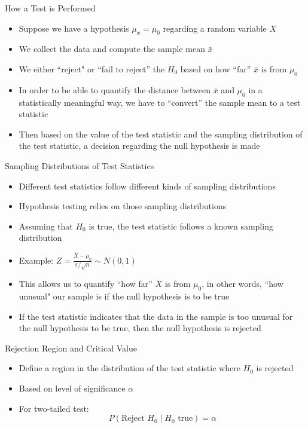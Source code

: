 \documentclass[12pt, aspectratio=169]{beamer}
\begin{document}
    \begin{frame}{How a Test is Performed}
        \begin{itemize}
            \item Suppose we have a hypothesis \(\mu_x = \mu_0\) regarding a random variable \(X\)
            \item We collect the data and compute the sample mean \(\bar{x}\)
            \item We either ``reject" or ``fail to reject'' the \(H_0\) based on how ``far'' \(\bar{x}\) is from \(\mu_0\)
            \item In order to be able to quantify the distance between \(\bar{x}\) and \(\mu_0\) in a statistically meaningful way, we have to ``convert'' the sample mean to a test statistic
            \item Then based on the value of the test statistic and the sampling distribution of the test statistic, a decision regarding the null hypothesis is made
        \end{itemize}
    \end{frame}


    \begin{frame}{Sampling Distributions of Test Statistics}
        \begin{itemize}
            \item Different test statistics follow different kinds of sampling distributions
            \item Hypothesis testing relies on those sampling distributions
            \item Assuming that $H_0$ is true, the test statistic follows a known sampling distribution
            \item Example: \(Z = \frac{\bar{X} - \mu_0}{\sigma/\sqrt{n}} \sim N(0,1)\)
            \item This allows us to quantify ``how far'' \(\bar{X}\) is from \(\mu_0\), in other words, ``how unusual" our sample is if the null hypothesis is to be true
            \item If the test statistic indicates that the data in the sample is too unusual for the null hypothesis to be true, then the null hypothesis is rejected
        \end{itemize}
    \end{frame}


    \begin{frame}{Rejection Region and Critical Value}
        \begin{itemize}
            \item Define a region in the distribution of the test statistic where $H_0$ is rejected
            \item Based on level of significance $\alpha$
            \item For two-tailed test:
            \[
            P(\text{Reject } H_0 \mid H_0 \text{ true}) = \alpha
            \]
        \end{itemize}

    \end{frame}
\end{document}
